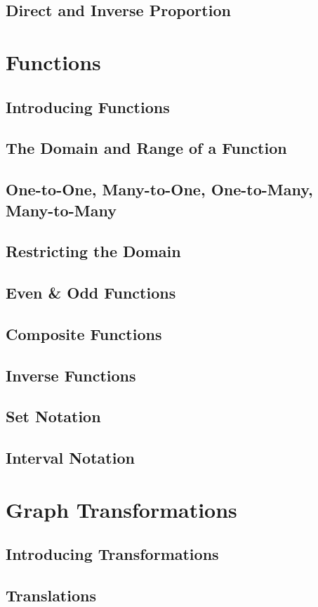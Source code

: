 \documentclass[../maths.tex]{subfiles}
\begin{document}
\subsection*{Direct and Inverse Proportion}
\section{Functions}
\subsection*{Introducing Functions}
\subsection*{The Domain and Range of a Function}
\subsection*{One-to-One, Many-to-One, One-to-Many, Many-to-Many}
\subsection*{Restricting the Domain}
\subsection*{Even \& Odd Functions}
\subsection*{Composite Functions}
\subsection*{Inverse Functions}
\subsection*{Set Notation}
\subsection*{Interval Notation}
\section{Graph Transformations}
\subsection*{Introducing Transformations}
\subsection*{Translations}
\end{document}
